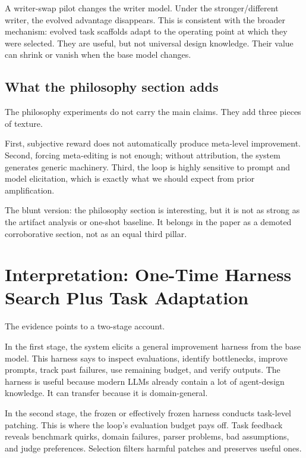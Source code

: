 \documentclass[11pt]{article}
\begin{document}
A writer-swap pilot changes the writer model. Under the stronger/different writer, the evolved advantage disappears. This is consistent with the broader mechanism: evolved task scaffolds adapt to the operating point at which they were selected. They are useful, but not universal design knowledge. Their value can shrink or vanish when the base model changes.

\subsection{What the philosophy section adds}\label{what-the-philosophy-section-adds}

The philosophy experiments do not carry the main claims. They add three pieces of texture.

First, subjective reward does not automatically produce meta-level improvement. Second, forcing meta-editing is not enough; without attribution, the system generates generic machinery. Third, the loop is highly sensitive to prompt and model elicitation, which is exactly what we should expect from prior amplification.

The blunt version: the philosophy section is interesting, but it is not as strong as the artifact analysis or one-shot baseline. It belongs in the paper as a demoted corroborative section, not as an equal third pillar.

\section{Interpretation: One-Time Harness Search Plus Task Adaptation}\label{interpretation-one-time-harness-search-plus-task-adaptation}

The evidence points to a two-stage account.

In the first stage, the system elicits a general improvement harness from the base model. This harness says to inspect evaluations, identify bottlenecks, improve prompts, track past failures, use remaining budget, and verify outputs. The harness is useful because modern LLMs already contain a lot of agent-design knowledge. It can transfer because it is domain-general.

In the second stage, the frozen or effectively frozen harness conducts task-level patching. This is where the loop's evaluation budget pays off. Task feedback reveals benchmark quirks, domain failures, parser problems, bad assumptions, and judge preferences. Selection filters harmful patches and preserves useful ones.
\end{document}
